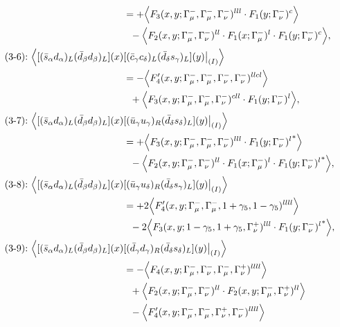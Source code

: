 \begin{align}
&=
 + \Big\langle F_3(x,y;\Gamma_\mu^-,\Gamma_\mu^-,\Gamma_\nu^-)^{lll} \cdot F_1(y;\Gamma_\nu^-)^c\Big\rangle
\notag\\*&\ \ 
 - \Big\langle F_2(x,y;\Gamma_\mu^-,\Gamma_\nu^-)^{ll} \cdot F_1(x;\Gamma_\mu^-)^l \cdot F_1(y;\Gamma_\nu^-)^c\Big\rangle,
\\
\mbox{(3-6):}\ 
\Big\langle
[(\bar s_\alpha d_\alpha)_L(\bar d_\beta d_\beta)_L](x)&
[(\bar c_\gamma c_\delta)_L(\bar d_\delta s_\gamma)_L](y)\big|_{(I)}
\Big\rangle
\notag\\*
&=
 - \Big\langle F_4'(x,y;\Gamma_\mu^-,\Gamma_\mu^-,\Gamma_\nu^-,\Gamma_\nu^-)^{llcl}\Big\rangle
\notag\\*&\ \ 
 + \Big\langle F_3(x,y;\Gamma_\mu^-,\Gamma_\mu^-,\Gamma_\nu^-)^{cll} \cdot F_1(y;\Gamma_\nu^-)^l\Big\rangle,
\\
\mbox{(3-7):}\ 
\Big\langle
[(\bar s_\alpha d_\alpha)_L(\bar d_\beta d_\beta)_L](x)&
[(\bar u_\gamma u_\gamma)_R(\bar d_\delta s_\delta)_L](y)\big|_{(I)}
\Big\rangle
\notag\\*
&=
 + \Big\langle F_3(x,y;\Gamma_\mu^-,\Gamma_\mu^-,\Gamma_\nu^-)^{lll} \cdot {F_1(y;\Gamma_\nu^-)^l}^*\Big\rangle
\notag\\*&\ \ 
 - \Big\langle F_2(x,y;\Gamma_\mu^-,\Gamma_\nu^-)^{ll} \cdot F_1(x;\Gamma_\mu^-)^l \cdot {F_1(y;\Gamma_\nu^-)^l}^*\Big\rangle,
\\
\mbox{(3-8):}\ 
\Big\langle
[(\bar s_\alpha d_\alpha)_L(\bar d_\beta d_\beta)_L](x)&
[(\bar u_\gamma u_\delta)_R(\bar d_\delta s_\gamma)_L](y)\big|_{(I)}
\Big\rangle
\notag\\*
&=
 + 2\Big\langle F_4'(x,y;\Gamma_\mu^-,\Gamma_\mu^-,1+\gamma_5,1-\gamma_5)^{llll}\Big\rangle
\notag\\*&\ \ 
-2\Big\langle F_3(x,y;1-\gamma_5,1+\gamma_5,\Gamma_\nu^+)^{lll} \cdot {F_1(y;\Gamma_\nu^-)^l}^*\Big\rangle,
\\
\mbox{(3-9):}\ 
\Big\langle
[(\bar s_\alpha d_\alpha)_L(\bar d_\beta d_\beta)_L](x)&
[(\bar d_\gamma d_\gamma)_R(\bar d_\delta s_\delta)_L](y)\big|_{(I)}
\Big\rangle
\notag\\*
&=
 - \Big\langle F_4(x,y;\Gamma_\mu^-,\Gamma_\nu^-,\Gamma_\mu^-,\Gamma_\nu^+)^{llll}\Big\rangle
\notag\\*&\ \ 
 + \Big\langle F_2(x,y;\Gamma_\mu^-,\Gamma_\nu^-)^{ll} \cdot F_2(x,y;\Gamma_\mu^-,\Gamma_\nu^+)^{ll}\Big\rangle
\notag\\*&\ \ 
 - \Big\langle F_4'(x,y;\Gamma_\mu^-,\Gamma_\mu^-,\Gamma_\nu^+,\Gamma_\nu^-)^{llll}\Big\rangle
\notag\\*&\ \ 

\end{align}
